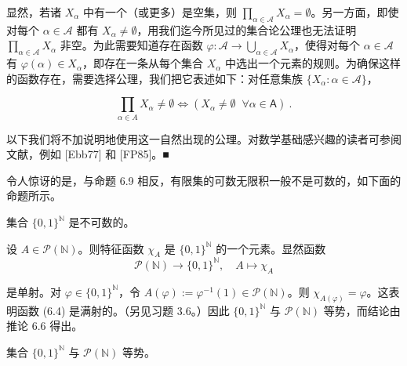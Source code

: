 \begin{remark}

显然，若诸 $ X_\alpha $ 中有一个（或更多）是空集，则 $ \prod_{\alpha \in \mathcal{A}} X_\alpha = \emptyset $。另一方面，即使对每个 $ \alpha \in \mathcal{A} $ 都有 $ X_\alpha \neq \emptyset $，用我们迄今所见过的集合论公理也无法证明 $ \prod_{\alpha \in \mathcal{A}} X_\alpha $ 非空。为此需要知道存在函数 $ \varphi: \mathcal{A} \to \bigcup_{\alpha \in \mathcal{A}} X_\alpha $，使得对每个 $ \alpha \in \mathcal{A} $ 有 $ \varphi(\alpha) \in X_\alpha $，即存在一条从每个集合 $ X_\alpha $ 中选出一个元素的规则。为确保这样的函数存在，需要选择公理，我们把它表述如下：对任意集族 $ \{X_\alpha : \alpha \in \mathcal{A}\} $，

\[
\prod_{\alpha\in A}X_{\alpha}\neq\emptyset\Longleftrightarrow(X_{\alpha}\neq\emptyset\;\;\forall\alpha\in\mathsf{A})~.
\]

以下我们将不加说明地使用这一自然出现的公理。对数学基础感兴趣的读者可参阅文献，例如 [Ebb77] 和 [FP85]。■

令人惊讶的是，与命题 6.9 相反，有限集的可数无限积一般不是可数的，如下面的命题所示。

\end{remark}

\begin{proposition}

集合 $ \{0,1\}^{\mathbb{N}} $ 是不可数的。

\proofhead
设 $ A \in \mathcal{P}(\mathbb{N}) $。则特征函数 $ \chi_A $ 是 $ \{0,1\}^{\mathbb{N}} $ 的一个元素。显然函数
\begin{equation}
\mathcal{P}(\mathbb{N})\to\{0,1\}^{\mathbb{N}},\quad A\mapsto\chi_{A}
\end{equation}

是单射。对 $\varphi \in \{0,1\}^{\mathbb{N}}$，令 $A(\varphi):=\varphi^{-1}(1)\in \mathcal{P}(\mathbb{N})$。则 $\chi_{A(\varphi)}=\varphi$。这表明函数 (6.4) 是满射的。（另见习题 3.6。）因此 $\{0,1\}^{\mathbb{N}}$ 与 $\mathcal{P}(\mathbb{N})$ 等势，而结论由推论 6.6 得出。

\end{proposition}

\begin{corollary}

集合 $\{0,1\}^{\mathbb{N}}$ 与 $\mathcal{P}(\mathbb{N})$ 等势。

\end{corollary}

\exerciseshead

